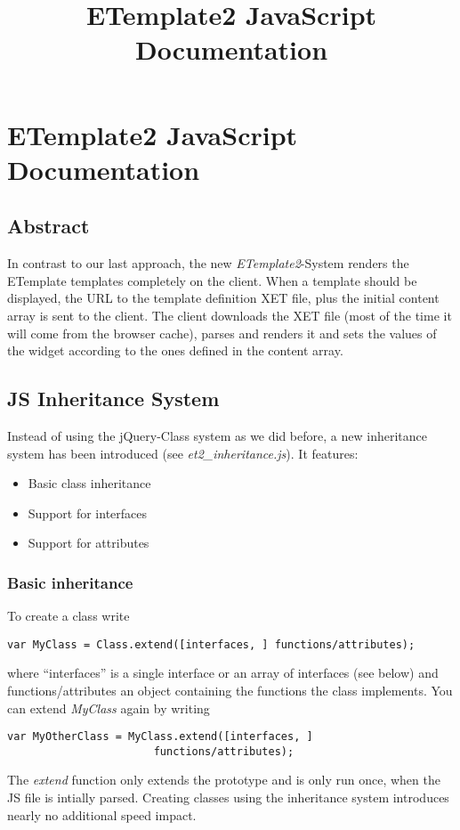 \documentclass[10pt,a4paper]{report}
\title{ETemplate2 JavaScript Documentation}
\begin{document}
\chapter*{ETemplate2 JavaScript Documentation}

\section*{Abstract}

In contrast to our last approach, the new \textit{ETemplate2}-System renders the ETemplate templates completely on the client. When a template should be displayed, the URL to the template definition XET file, plus the initial content array is sent to the client. The client downloads the XET file (most of the time it will come from the browser cache), parses and renders it and sets the values of the widget according to the ones defined in the content array.

\section*{JS Inheritance System}
Instead of using the jQuery-Class system as we did before, a new inheritance system has been introduced (see \textit{et2\_inheritance.js}). It features:
\begin{itemize}
	\item Basic class inheritance
	\item Support for interfaces
	\item Support for attributes
\end{itemize}

\subsection*{Basic inheritance}

To create a class write
\begin{verbatim}
var MyClass = Class.extend([interfaces, ] functions/attributes);
\end{verbatim}
where ``interfaces'' is a single interface or an array of interfaces (see below) and functions/attributes an object containing the functions the class implements. You can extend \textit{MyClass} again by writing
\begin{verbatim}
var MyOtherClass = MyClass.extend([interfaces, ]
                       functions/attributes);
\end{verbatim}
The \textit{extend} function only extends the prototype and is only run once, when the JS file is intially parsed. Creating classes using the inheritance system introduces nearly no additional speed impact.
\end{document}
